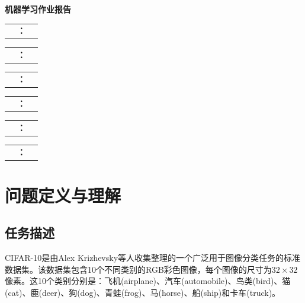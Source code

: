 \documentclass[12pt,a4paper]{article}
\begin{document}
\begin{titlepage}
    \centering
    \vspace*{4cm}
    {\Huge\bfseries 机器学习作业报告\par}
    \vspace{3cm}

    \begingroup
    \large
    \newcommand{\entrylines}[2]{%
        \noindent\begin{tabular}{c@{\hspace{0.5em}}c@{\hspace{0.5em}}c}
            \makebox[4em][s]{\hfill\textbf{#1}\hfill} & \textbf{：} & \makebox[15em]{\hfill #2 \hfill} \\
        \end{tabular}\par%
        \vspace{1.5em}%
    }
    \entrylines{专业}{XXXXXXXXX}
    \entrylines{班级}{XXX}
    \entrylines{学号}{UXXXXXXXXX}
    \entrylines{姓名}{XXXX}
    \entrylines{电话}{8888888888}
    \entrylines{邮箱}{XXXXX@xxx.com}
    \endgroup

    \vfill
\end{titlepage}

\begin{abstract}
本报告系统研究了CIFAR-10数据集上的图像分类问题，分别实现了多层感知机(MLP)、卷积神经网络(CNN)和ResNet-18三种模型架构。通过大量消融实验，深入分析了Batch Normalization、Dropout、优化器选择、学习率调度和数据增强等关键技术对模型性能的影响。实验结果表明，ResNet-18在测试集上达到了95.05\%的准确率（基线模型，200轮），显著优于CNN(91.11\%)和MLP(60.51\%)。本报告详细记录了实验设计、结果分析和结论。
\end{abstract}

\tableofcontents
\newpage

\section{问题定义与理解}

\subsection{任务描述}

CIFAR-10是由Alex Krizhevsky等人收集整理的一个广泛用于图像分类任务的标准数据集\cite{krizhevsky2009learning}。该数据集包含10个不同类别的RGB彩色图像，每个图像的尺寸为$32 \times 32$像素。这10个类别分别是：飞机(airplane)、汽车(automobile)、鸟类(bird)、猫(cat)、鹿(deer)、狗(dog)、青蛙(frog)、马(horse)、船(ship)和卡车(truck)。
\end{document}
